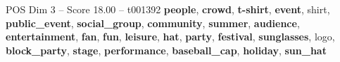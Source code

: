 \begin{textsample}{POS Dim 3 – Score 18.00 – t001392}  \label{ex:f3_pos_016}
\textbf{people}, \textbf{crowd}, \textbf{t-shirt}, \textbf{event}, shirt, \textbf{public\_event}, \textbf{social\_group}, \textbf{community}, \textbf{summer}, \textbf{audience}, \textbf{entertainment}, \textbf{fan}, \textbf{fun}, \textbf{leisure}, \textbf{hat}, \textbf{party}, \textbf{festival}, \textbf{sunglasses}, logo, \textbf{block\_party}, \textbf{stage}, \textbf{performance}, \textbf{baseball\_cap}, \textbf{holiday}, \textbf{sun\_hat}

\end{textsample}
